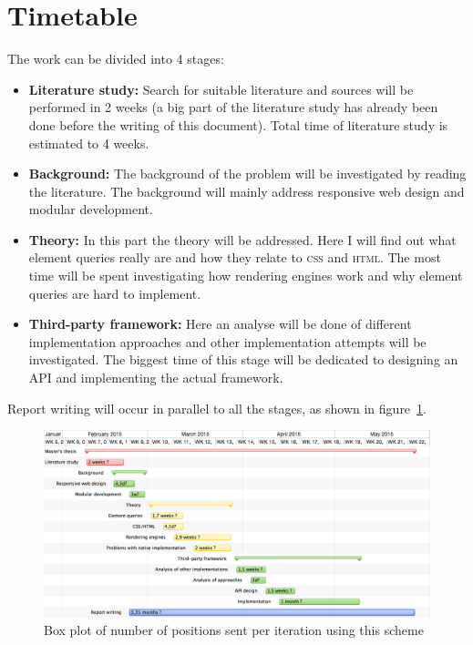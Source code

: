 \documentclass[oneside,a4paper,11pt]{kth-mag}
\begin{document}
\section*{Timetable}
The work can be divided into 4 stages:
\begin{itemize}
\item \textbf{Literature study:} Search for suitable literature and sources will be performed in 2 weeks (a big part of the literature study has already been done before the writing of this document). Total time of literature study is estimated to 4 weeks.
\item \textbf{Background:} The background of the problem will be investigated by reading the literature. The background will mainly address responsive web design and modular development.
\item \textbf{Theory:} In this part the theory will be addressed. Here I will find out what element queries really are and how they relate to \textsc{css} and \textsc{html}. The most time will be spent investigating how rendering engines work and why element queries are hard to implement.
\item \textbf{Third-party framework:} Here an analyse will be done of different implementation approaches and other implementation attempts will be investigated. The biggest time of this stage will be dedicated to designing an API and implementing the actual framework.
\end{itemize}

Report writing will occur in parallel to all the stages, as shown in figure~\ref{fig:timetable}.

\clearpage
\newpage

\begin{figure}
\centering
\includegraphics{timetable}
\caption{Box plot of number of positions sent per iteration using this scheme}
\label{fig:timetable}
\end{figure}
\restoregeometry
\end{document}
